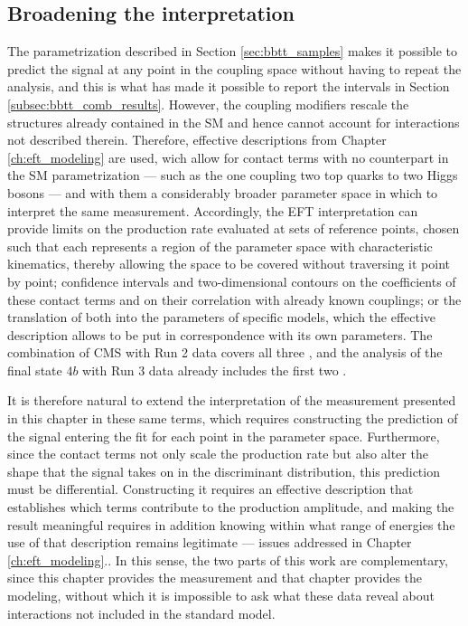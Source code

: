 \subsection{Broadening the interpretation}
\label{subsec:bbtt_prospects_interpretation}
The parametrization described in Section \ref{sec:bbtt_samples} makes it possible to predict the signal at any point in the coupling space without having to repeat the analysis, and this is what has made it possible to report the intervals in Section \ref{subsec:bbtt_comb_results}. However, the coupling modifiers rescale the structures already contained in the SM and hence cannot account for interactions not described therein. Therefore, effective descriptions from Chapter \ref{ch:eft_modeling} are used, wich allow for contact terms with no counterpart in the SM parametrization — such as the one coupling two top quarks to two Higgs bosons — and with them a considerably broader parameter space in which to interpret the same measurement. Accordingly, the EFT interpretation can provide limits on the production rate evaluated at sets of reference points, chosen such that each represents a region of the parameter space with characteristic kinematics, thereby allowing the space to be covered without traversing it point by point; confidence intervals and two-dimensional contours on the coefficients of these contact terms and on their correlation with already known couplings; or the translation of both into the parameters of specific models, which the effective description allows to be put in correspondence with its own parameters. The combination of CMS with Run 2 data covers all three \cite{CMS_combination}, and the analysis of the final state $4b$ with Run 3 data already includes the first two \cite{CMS:2026znu}.

It is therefore natural to extend the interpretation of the measurement presented in this chapter in these same terms, which requires constructing the prediction of the signal entering the fit for each point in the parameter space. Furthermore, since the contact terms not only scale the production rate but also alter the shape that the signal takes on in the discriminant distribution, this prediction must be differential. Constructing it requires an effective description that establishes which terms contribute to the production amplitude, and making the result meaningful requires in addition knowing within what range of energies the use of that description remains legitimate — issues addressed in Chapter \ref{ch:eft_modeling}.. In this sense, the two parts of this work are complementary, since this chapter provides the measurement and that chapter provides the modeling, without which it is impossible to ask what these data reveal about interactions not included in the standard model.



